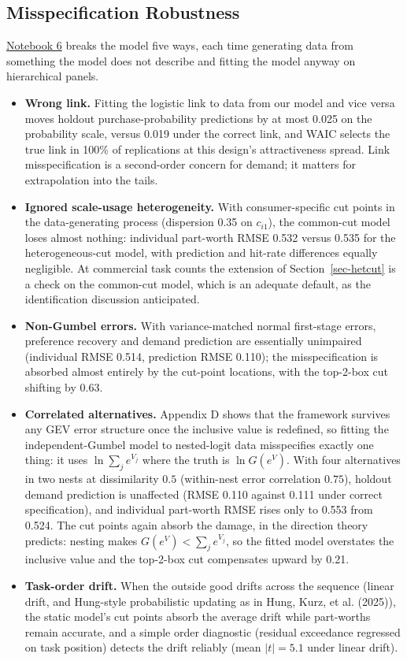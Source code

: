 \documentclass[
  letterpaper,
  DIV=11,
  numbers=noendperiod]{scrartcl}
\providecommand{\tightlist}{%
  \setlength{\itemsep}{0pt}\setlength{\parskip}{0pt}}
\theoremstyle{plain}
\theoremstyle{plain}
\theoremstyle{plain}
\theoremstyle{remark}
\begin{document}
\subsection{Misspecification Robustness}\label{sec-sim-robust}

\href{notebooks/06-misspecification.qmd}{Notebook 6} breaks the model
five ways, each time generating data from something the model does not
describe and fitting the model anyway on hierarchical panels.

\begin{itemize}
\tightlist
\item
  \textbf{Wrong link.} Fitting the logistic link to data from our model
  and vice versa moves holdout purchase-probability predictions by at
  most 0.025 on the probability scale, versus 0.019 under the correct
  link, and WAIC selects the true link in 100\% of replications at this
  design's attractiveness spread. Link misspecification is a
  second-order concern for demand; it matters for extrapolation into the
  tails.
\item
  \textbf{Ignored scale-usage heterogeneity.} With consumer-specific cut
  points in the data-generating process (dispersion 0.35 on \(c_{i1}\)),
  the common-cut model loses almost nothing: individual part-worth RMSE
  0.532 versus 0.535 for the heterogeneous-cut model, with prediction
  and hit-rate differences equally negligible. At commercial task counts
  the extension of Section~\ref{sec-hetcut} is a check on the common-cut
  model, which is an adequate default, as the identification discussion
  anticipated.
\item
  \textbf{Non-Gumbel errors.} With variance-matched normal first-stage
  errors, preference recovery and demand prediction are essentially
  unimpaired (individual RMSE 0.514, prediction RMSE 0.110); the
  misspecification is absorbed almost entirely by the cut-point
  locations, with the top-2-box cut shifting by 0.63.
\item
  \textbf{Correlated alternatives.} Appendix D shows that the framework
  survives any GEV error structure once the inclusive value is
  redefined, so fitting the independent-Gumbel model to nested-logit
  data misspecifies exactly one thing: it uses \(\ln \sum_j e^{V_j}\)
  where the truth is \(\ln G(e^{V})\). With four alternatives in two
  nests at dissimilarity \(0.5\) (within-nest error correlation
  \(0.75\)), holdout demand prediction is unaffected (RMSE 0.110 against
  0.111 under correct specification), and individual part-worth RMSE
  rises only to 0.553 from 0.524. The cut points again absorb the
  damage, in the direction theory predicts: nesting makes
  \(G(e^{V}) < \sum_j e^{V_j}\), so the fitted model overstates the
  inclusive value and the top-2-box cut compensates upward by 0.21.
\item
  \textbf{Task-order drift.} When the outside good drifts across the
  sequence (linear drift, and Hung-style probabilistic updating as in
  Hung, Kurz, et al. (2025)), the static model's cut points absorb the
  average drift while part-worths remain accurate, and a simple order
  diagnostic (residual exceedance regressed on task position) detects
  the drift reliably (mean \(|t| = 5.1\) under linear drift).
\end{itemize}
\end{document}
